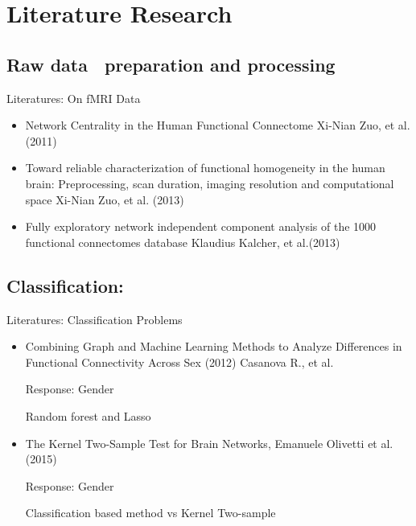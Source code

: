 \documentclass[bigger]{beamer}
\begin{document}
\section{Literature Research}
\subsection{Raw data　preparation and processing}
\begin{frame}[label=sec-3-1]{Literatures: On fMRI Data}
\label{sec-3-1}
\begin{itemize}
\item Network Centrality in the Human Functional Connectome
Xi-Nian Zuo, et al.
(2011)\\

\item Toward reliable characterization of functional homogeneity in the human brain:
Preprocessing, scan duration, imaging resolution and computational space 
Xi-Nian Zuo, et al.
(2013)\\

\item Fully exploratory network independent component analysis of the 1000 functional connectomes database
Klaudius Kalcher, et al.(2013)
\end{itemize}
\end{frame}

\subsection{Classification:}
\begin{frame}[label=sec-3-2-1]{Literatures: Classification Problems}
\label{sec-3-2-1}
\begin{itemize}



\item Combining Graph and Machine Learning Methods to Analyze Differences
in Functional Connectivity Across Sex (2012)
Casanova R., et al.

Response: Gender

Random forest and Lasso

\item The Kernel Two-Sample Test for Brain Networks,
Emanuele Olivetti et al. (2015)

Response: Gender

Classification based method vs Kernel Two-sample
\end{itemize}
\end{frame}
\end{document}
